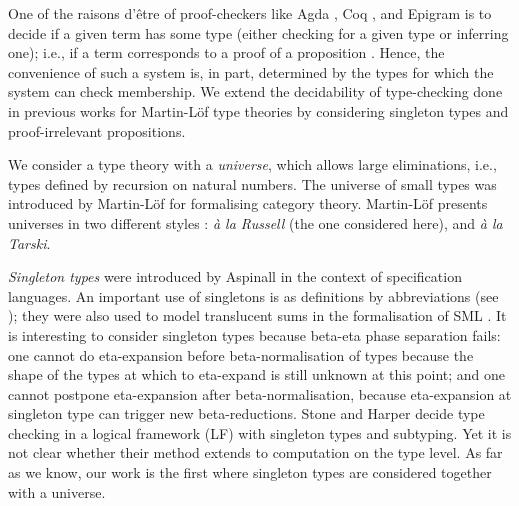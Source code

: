 \documentclass{LMCS}
\theoremstyle{plain}\newtheorem{satz}[thm]{Satz}
\newcommand{\LONGVERSION}[1]{#1}
\newcommand{\LONGVERSION}[1]{}
\begin{document}
\noindent One of the raisons d'\^{e}tre of
proof-checkers like Agda \cite{norell:PhD}, Coq \cite{coq81}, and
Epigram \cite{mcBride:afp04} is to decide if a given term has some
type (either checking for a given type or inferring one); i.e., if
a term corresponds to a proof of a proposition
\cite{harperHonsellPlotkin:LF}.  Hence, the convenience of such a
system is, in part, determined by the types for which the system can
check membership. We extend the decidability of type-checking done in
previous works \cite{abelAehligDybjer:mfps07,abelCoquandDybjer:lics07}
for Martin-L\"{o}f type theories \cite{mlitt,nordstroem:mltt} by
considering singleton types and proof-irrelevant propositions.

\LONGVERSION{We consider a type theory with a \emph{universe}, which
  allows large eliminations, i.e., types defined by recursion on
  natural numbers. 
The universe of small types was introduced by
  Martin-L\"{o}f \cite{martinlof72} for formalising category theory.
Martin-L\"of presents universes in two different styles \cite{mlitt}: 
  {\em \`a la Russell} (the one considered here), and {\em \`a la Tarski}.}

\emph{Singleton types} were introduced by Aspinall \cite{aspinall:csl94} in
the context of specification languages. An important use of singletons
is as definitions by abbreviations (see
\cite{aspinall:csl94,coquandPollackTakeyama:fundinf05}); they were
also used to model translucent sums in the formalisation of SML
\cite{harper:popl07}.  It is interesting to consider singleton types
because beta-eta phase separation fails: one cannot do eta-expansion before
beta-normalisation of types because the shape of the types at which to
eta-expand is still unknown at this point; and one cannot postpone
eta-expansion after beta-normalisation, because eta-expansion at
singleton type can
trigger new beta-reductions. 
Stone and Harper \cite{stoneHarper:tocl06} decide type checking in a
logical framework (LF) with singleton types and subtyping.  Yet it is not clear
whether their method extends to computation on the type level.  As far
as we know, our work is the first where singleton types are considered
together with a universe.
\end{document}
